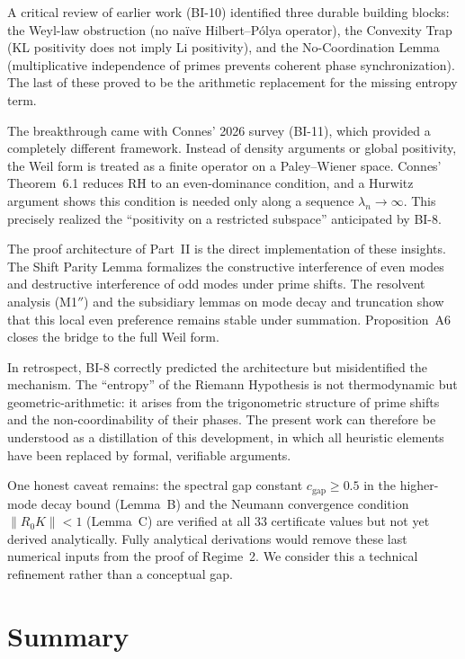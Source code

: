 \documentclass[12pt,a4paper]{article}
\theoremstyle{definition}
\theoremstyle{remark}
\begin{document}
A critical review of earlier work (BI-10) identified three durable building blocks: the Weyl-law obstruction (no na\"ive Hilbert--P\'olya operator), the Convexity Trap (KL positivity does not imply Li positivity), and the No-Coordination Lemma (multiplicative independence of primes prevents coherent phase synchronization). The last of these proved to be the arithmetic replacement for the missing entropy term.

The breakthrough came with Connes' 2026 survey \cite{Connes2025} (BI-11), which provided a completely different framework. Instead of density arguments or global positivity, the Weil form is treated as a finite operator on a Paley--Wiener space. Connes' Theorem~6.1 reduces RH to an even-dominance condition, and a Hurwitz argument shows this condition is needed only along a sequence $\lambda_n \to \infty$. This precisely realized the ``positivity on a restricted subspace'' anticipated by BI-8.

The proof architecture of Part~II is the direct implementation of these insights. The Shift Parity Lemma formalizes the constructive interference of even modes and destructive interference of odd modes under prime shifts. The resolvent analysis (M1$''$) and the subsidiary lemmas on mode decay and truncation show that this local even preference remains stable under summation. Proposition~A6 closes the bridge to the full Weil form.

In retrospect, BI-8 correctly predicted the architecture but misidentified the mechanism. The ``entropy'' of the Riemann Hypothesis is not thermodynamic but geometric-arithmetic: it arises from the trigonometric structure of prime shifts and the non-coordinability of their phases. The present work can therefore be understood as a distillation of this development, in which all heuristic elements have been replaced by formal, verifiable arguments.

One honest caveat remains: the spectral gap constant $c_{\mathrm{gap}} \geq 0.5$ in the higher-mode decay bound (Lemma~B) and the Neumann convergence condition $\|R_0 K\| < 1$ (Lemma~C) are verified at all $33$ certificate values but not yet derived analytically. Fully analytical derivations would remove these last numerical inputs from the proof of Regime~2. We consider this a technical refinement rather than a conceptual gap.


\section{Summary}
\label{sec:summary}
\end{document}
